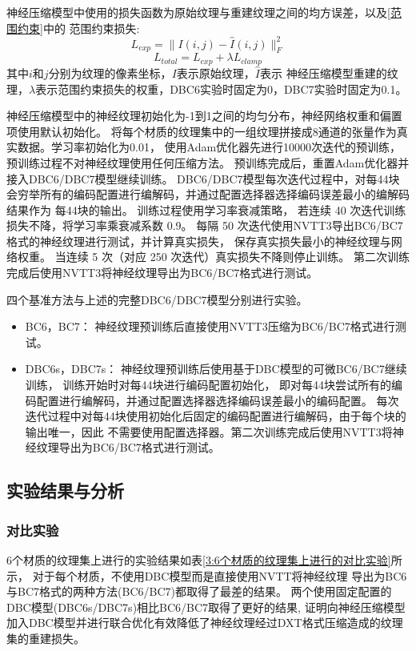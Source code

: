 神经压缩模型中使用的损失函数为原始纹理与重建纹理之间的均方误差，以及\ref{范围约束}中的
范围约束损失:
\begin{equation}
    L_{exp}=\| I(i,j) - \hat{I}(i,j) \|^2_F
\end{equation}
\begin{equation}
    L_{total}=L_{exp}+\lambda L_{clamp}
\end{equation}
其中$i$和$j$分别为纹理的像素坐标，$I$表示原始纹理，$\hat{I}$表示
神经压缩模型重建的纹理，$\lambda$表示范围约束损失的权重，DBC6实验时固定为0，DBC7实验时固定为0.1。

神经压缩模型中的神经纹理初始化为-1到1之间的均匀分布，神经网络权重和偏置项使用默认初始化。
将每个材质的纹理集中的一组纹理拼接成8通道的张量作为真实数据。学习率初始化为0.01，
使用Adam优化器先进行10000次迭代的预训练，预训练过程不对神经纹理使用任何压缩方法。
预训练完成后，重置Adam优化器并接入DBC6/DBC7模型继续训练。
DBC6/DBC7模型每次迭代过程中，对每4\times4块会穷举所有的编码配置进行编解码，并通过配置选择器选择编码误差最小的编解码结果作为
每4\times4块的输出。
训练过程使用学习率衰减策略，
若连续 40 次迭代训练损失不降，将学习率乘衰减系数 0.9。
每隔 50 次迭代使用NVTT3导出BC6/BC7格式的神经纹理进行测试，并计算真实损失，
保存真实损失最小的神经纹理与网络权重。
当连续 5 次（对应 250 次迭代）真实损失不降则停止训练。
第二次训练完成后使用NVTT3将神经纹理导出为BC6/BC7格式进行测试。

四个基准方法与上述的完整DBC6/DBC7模型分别进行实验。

\begin{itemize}
    \item BC6，BC7： 神经纹理预训练后直接使用NVTT3压缩为BC6/BC7格式进行测试。
    \item DBC6s，DBC7s： 神经纹理预训练后使用基于DBC模型的可微BC6/BC7继续训练，
    训练开始时对每4\times4块进行编码配置初始化，
    即对每4\times4块尝试所有的编码配置进行编解码，并通过配置选择器选择编码误差最小的编码配置。
    每次迭代过程中对每4\times4块使用初始化后固定的编码配置进行编解码，由于每个块的输出唯一，因此
    不需要使用配置选择器。第二次训练完成后使用NVTT3将神经纹理导出为BC6/BC7格式进行测试。
\end{itemize}

\subsection{实验结果与分析}

\subsubsection{对比实验}
\label{3:对比实验}
6个材质的纹理集上进行的实验结果如表\ref{3:6个材质的纹理集上进行的对比实验}所示，
对于每个材质，不使用DBC模型而是直接使用NVTT将神经纹理
导出为BC6与BC7格式的两种方法(BC6/BC7)都取得了最差的结果。
两个使用固定配置的DBC模型(DBC6s/DBC7s)相比BC6/BC7取得了更好的结果,
证明向神经压缩模型加入DBC模型并进行联合优化有效降低了神经纹理经过DXT格式压缩造成的纹理集的重建损失。

